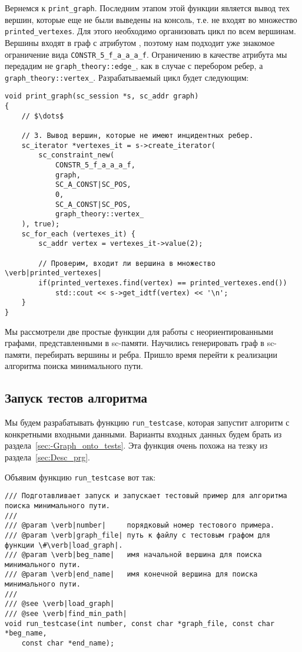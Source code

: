 Вернемся к \lstinline|print_graph|. Последним этапом этой функции
является вывод тех вершин, которые еще не были выведены на консоль,
т.е. не входят во множество \lstinline|printed_vertexes|. Для этого
необходимо организовать цикл по всем вершинам.  Вершины входят в граф
с атрибутом , поэтому нам подходит уже знакомое
ограничение вида \lstinline|CONSTR_5_f_a_a_a_f|. Ограничению в
качестве атрибута мы передадим не \lstinline|graph_theory::edge_|, как
в случае с перебором ребер, а
\lstinline|graph_theory::vertex_|. Разрабатываемый цикл будет
следующим:
\begin{lstlisting}[texcl]
void print_graph(sc_session *s, sc_addr graph)
{
    // $\dots$

    // 3. Вывод вершин, которые не имеют инцидентных ребер.
    sc_iterator *vertexes_it = s->create_iterator(
        sc_constraint_new(
            CONSTR_5_f_a_a_a_f,
            graph,
            SC_A_CONST|SC_POS,
            0,
            SC_A_CONST|SC_POS,
            graph_theory::vertex_
    ), true);
    sc_for_each (vertexes_it) {
        sc_addr vertex = vertexes_it->value(2);

        // Проверим, входит ли вершина в множество \verb|printed_vertexes|
        if(printed_vertexes.find(vertex) == printed_vertexes.end())
            std::cout << s->get_idtf(vertex) << '\n';
    }
}
\end{lstlisting}

Мы рассмотрели две простые функции для работы с неориентированными
графами, представленными в sc-памяти. Научились генерировать граф в
sc-памяти, перебирать вершины и ребра. Пришло время перейти к
реализации алгоритма поиска минимального пути.

\subsection{Запуск тестов алгоритма}
\label{sec:libscprg_run_testcase}

Мы будем разрабатывать функцию \lstinline|run_testcase|, которая
запустит алгоритм с конкретными входными данными. Варианты входных
данных будем брать из раздела~\ref{sec:-Graph_onto_tests}. Эта функция
очень похожа на тезку из раздела~\ref{sec:Desc_prg}.

Объявим функцию \lstinline|run_testcase| вот так:
\begin{lstlisting}[texcl]
/// Подготавливает запуск и запускает тестовый пример для алгоритма поиска минимального пути.
///
/// @param \verb|number|     порядковый номер тестового примера.
/// @param \verb|graph_file| путь к файлу с тестовым графом для функции \#\verb|load_graph|.
/// @param \verb|beg_name|   имя начальной вершина для поиска минимального пути.
/// @param \verb|end_name|   имя конечной вершина для поиска минимального пути.
///
/// @see \verb|load_graph|
/// @see \verb|find_min_path|
void run_testcase(int number, const char *graph_file, const char *beg_name,
    const char *end_name);
\end{lstlisting}


